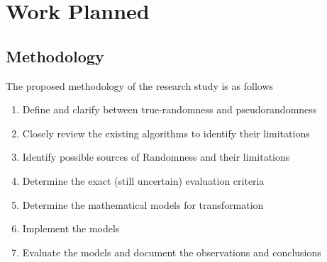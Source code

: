 \documentclass{scrartcl}
\begin{document}
\newpage\section{Work Planned}
    \subsection{Methodology}
        The proposed methodology of the research study is as follows
        \begin{enumerate}
            \item Define and clarify between true-randomness and pseudorandomness
            \item Closely review the existing algorithms to identify their limitations
            \item Identify possible sources of Randomness and their limitations
            \item Determine the exact (still uncertain) evaluation criteria
            \item Determine the mathematical models for transformation
            \item Implement the models
            \item Evaluate the models and document the observations and conclusions
        \end{enumerate}
        
\end{document}
